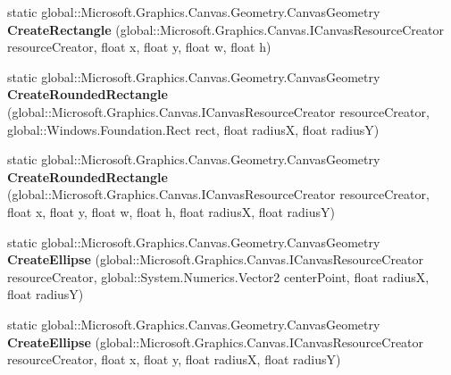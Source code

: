 \begin{DoxyCompactItemize}
static global\+::\+Microsoft.\+Graphics.\+Canvas.\+Geometry.\+Canvas\+Geometry {\bfseries Create\+Rectangle} (global\+::\+Microsoft.\+Graphics.\+Canvas.\+I\+Canvas\+Resource\+Creator resource\+Creator, float x, float y, float w, float h)
\item 
\mbox{\label{class_microsoft_1_1_graphics_1_1_canvas_1_1_geometry_1_1_canvas_geometry_a009788642a98b2179cad9bba9b1965dd}} 
static global\+::\+Microsoft.\+Graphics.\+Canvas.\+Geometry.\+Canvas\+Geometry {\bfseries Create\+Rounded\+Rectangle} (global\+::\+Microsoft.\+Graphics.\+Canvas.\+I\+Canvas\+Resource\+Creator resource\+Creator, global\+::\+Windows.\+Foundation.\+Rect rect, float radiusX, float radiusY)
\item 
\mbox{\label{class_microsoft_1_1_graphics_1_1_canvas_1_1_geometry_1_1_canvas_geometry_a11c20ec470232154e23df2c9cb9c10dd}} 
static global\+::\+Microsoft.\+Graphics.\+Canvas.\+Geometry.\+Canvas\+Geometry {\bfseries Create\+Rounded\+Rectangle} (global\+::\+Microsoft.\+Graphics.\+Canvas.\+I\+Canvas\+Resource\+Creator resource\+Creator, float x, float y, float w, float h, float radiusX, float radiusY)
\item 
\mbox{\label{class_microsoft_1_1_graphics_1_1_canvas_1_1_geometry_1_1_canvas_geometry_a66008979f1f25a70e38f6044abf0aca6}} 
static global\+::\+Microsoft.\+Graphics.\+Canvas.\+Geometry.\+Canvas\+Geometry {\bfseries Create\+Ellipse} (global\+::\+Microsoft.\+Graphics.\+Canvas.\+I\+Canvas\+Resource\+Creator resource\+Creator, global\+::\+System.\+Numerics.\+Vector2 center\+Point, float radiusX, float radiusY)
\item 
\mbox{\label{class_microsoft_1_1_graphics_1_1_canvas_1_1_geometry_1_1_canvas_geometry_a60460178970082d9e7b6673b17fb88ec}} 
static global\+::\+Microsoft.\+Graphics.\+Canvas.\+Geometry.\+Canvas\+Geometry {\bfseries Create\+Ellipse} (global\+::\+Microsoft.\+Graphics.\+Canvas.\+I\+Canvas\+Resource\+Creator resource\+Creator, float x, float y, float radiusX, float radiusY)
\item 
\mbox{\label{class_microsoft_1_1_graphics_1_1_canvas_1_1_geometry_1_1_canvas_geometry_a098a43184492d859176fd9ccac7a99b9}} 

\end{DoxyCompactItemize}
